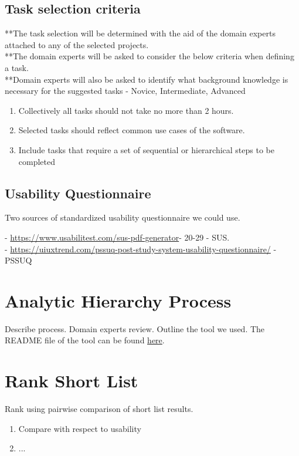 \documentclass[letterpaper,cleveref]{lipics-v2019}
\theoremstyle{definition}
\begin{document}
\subsection{Task selection criteria}
**The task selection will be determined with the aid of the domain experts attached to any of the selected projects.\\ 
**The domain experts will be asked to consider the below criteria when defining a task. \\
**Domain experts will also be asked to identify what background knowledge is necessary for the suggested tasks - Novice, Intermediate, Advanced
\begin {enumerate}
\item Collectively all tasks should not take no more than 2 hours.
\item Selected tasks should reflect common use cases of  the software.
\item Include tasks that require a set of sequential or hierarchical steps to be completed 

\end {enumerate} 


\subsection{Usability Questionnaire}
Two sources of standardized usability questionnaire we could use.

- \url{https://www.usabilitest.com/sus-pdf-generator}- 20-29 - SUS.\\
- \url{https://uiuxtrend.com/pssuq-post-study-system-usability-questionnaire/} - PSSUQ


\section{Analytic Hierarchy Process} \label{SecAHP}

Describe process. Domain experts review. Outline the tool we used. The README file of the tool can be found \href{run:../AHP2020/LBM/README.txt}{here}.

\section{Rank Short List} \label{SecRankShortList}
Rank using pairwise comparison of short list results.
\begin{enumerate}
	\item Compare with respect to usability
	\item ...
\end{enumerate}
\end{document}
